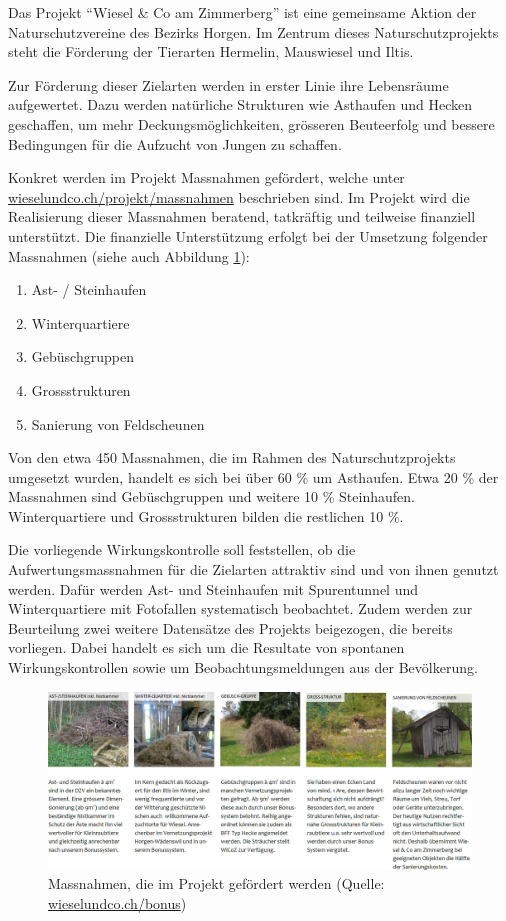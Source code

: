 \documentclass[
  oneside]{scrbook}
\providecommand{\tightlist}{%
  \setlength{\itemsep}{0pt}\setlength{\parskip}{0pt}}
\begin{document}
Das Projekt ``Wiesel \& Co am Zimmerberg'' ist eine gemeinsame Aktion der Naturschutzvereine des Bezirks Horgen. Im Zentrum dieses Naturschutzprojekts steht die Förderung der Tierarten Hermelin, Mauswiesel und Iltis.

Zur Förderung dieser Zielarten werden in erster Linie ihre Lebensräume aufgewertet. Dazu werden natürliche Strukturen wie Asthaufen und Hecken geschaffen, um mehr Deckungsmöglichkeiten, grösseren Beuteerfolg und bessere Bedingungen für die Aufzucht von Jungen zu schaffen.

Konkret werden im Projekt Massnahmen gefördert, welche unter \href{http://wieselundco.ch/projekt/massnahmen}{wieselundco.ch/projekt/massnahmen} beschrieben sind. Im Projekt wird die Realisierung dieser Massnahmen beratend, tatkräftig und teilweise finanziell unterstützt. Die finanzielle Unterstützung erfolgt bei der Umsetzung folgender Massnahmen (siehe auch Abbildung \ref{fig:massnahmen}):

\begin{enumerate}
\def\labelenumi{\arabic{enumi}.}
\tightlist
\item
  Ast- / Steinhaufen
\item
  Winterquartiere
\item
  Gebüschgruppen
\item
  Grossstrukturen
\item
  Sanierung von Feldscheunen
\end{enumerate}

Von den etwa 450 Massnahmen, die im Rahmen des Naturschutzprojekts umgesetzt wurden, handelt es sich bei über 60 \% um Asthaufen. Etwa 20 \% der Massnahmen sind Gebüschgruppen und weitere 10 \% Steinhaufen. Winterquartiere und Grossstrukturen bilden die restlichen 10 \%.

Die vorliegende Wirkungskontrolle soll feststellen, ob die Aufwertungsmassnahmen für die Zielarten attraktiv sind und von ihnen genutzt werden. Dafür werden Ast- und Steinhaufen mit Spurentunnel und Winterquartiere mit Fotofallen systematisch beobachtet. Zudem werden zur Beurteilung zwei weitere Datensätze des Projekts beigezogen, die bereits vorliegen. Dabei handelt es sich um die Resultate von spontanen Wirkungskontrollen sowie um Beobachtungsmeldungen aus der Bevölkerung.



\begin{figure}[H]
\includegraphics[width=1\linewidth]{images/massnahmen} \caption{Massnahmen, die im Projekt gefördert werden (Quelle: \href{http://www.wieselundco.ch/bonus}{wieselundco.ch/bonus})}\label{fig:massnahmen}
\end{figure}
\end{document}
